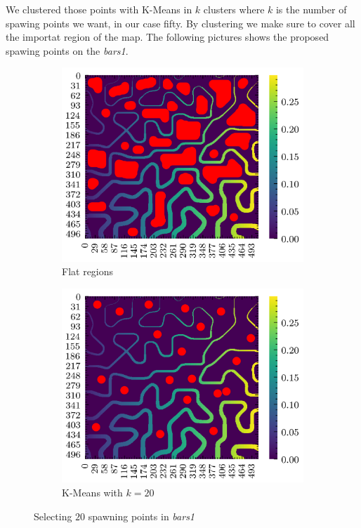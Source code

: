 \documentclass[../document.tex]{subfiles}
\begin{document}
We clustered those points with K-Means in $k$ clusters where $k$ is the number of spawing points we want, in our case fifty. By clustering we make sure to cover all the importat region of the map. The following pictures shows the proposed spawing points on the \emph{bars1}.

\begin{figure}[H]
    \begin{subfigure}[b]{0.5\textwidth}
        \includegraphics[width=\textwidth]{../img/3/spawn/flat-spawn-10.png}
        \caption{Flat regions}
    \end{subfigure}
    \begin{subfigure}[b]{0.5\textwidth}
        \includegraphics[width=\textwidth]{../img/3/spawn/spawn-10.png}
        \caption{K-Means with $k=20$}
    \end{subfigure}  
\label{fig: spawn-strat}
\caption{Selecting $20$ spawning points in \emph{bars1}}    
\end{figure}
\end{document}
